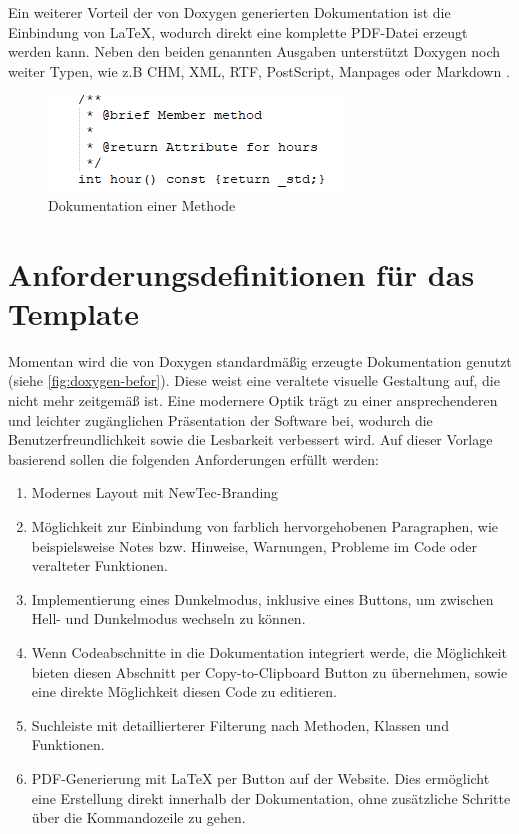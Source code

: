\documentclass[11pt,a4paper]{report}
\begin{document}
\noindent
Ein weiterer Vorteil der von Doxygen generierten Dokumentation ist die Einbindung von LaTeX, wodurch direkt eine komplette PDF-Datei erzeugt werden kann. Neben den beiden genannten Ausgaben unterstützt Doxygen noch weiter Typen, wie z.B  CHM, XML,  RTF,  PostScript,  Manpages oder Markdown \cite{doxygen}.
 \begin{figure}[H]
    \centering
    \includegraphics{images/Doxygen_Example.png}
    \caption{Dokumentation einer Methode}
    \label{fig:doxygen-example}
\end{figure}



\section{Anforderungsdefinitionen für das Template} \label{sec:Requirments}

Momentan wird die von Doxygen standardmäßig erzeugte Dokumentation genutzt (siehe \ref{fig:doxygen-befor}). Diese weist eine veraltete visuelle Gestaltung auf, die nicht mehr zeitgemäß ist. Eine modernere Optik trägt zu einer ansprechenderen und leichter zugänglichen Präsentation der Software bei, wodurch die Benutzerfreundlichkeit sowie die Lesbarkeit verbessert wird. Auf dieser Vorlage basierend sollen die folgenden Anforderungen erfüllt werden:
\begin{enumerate}[label=\textbf{A.\arabic*}]
    \item \label{req:Layout} Modernes Layout mit NewTec-Branding
    \item \label{req:Notes} Möglichkeit zur Einbindung von farblich hervorgehobenen Paragraphen, wie beispielsweise Notes bzw. Hinweise, Warnungen, Probleme im Code oder veralteter Funktionen.
    \item \label{req:Darkmode} Implementierung eines Dunkelmodus, inklusive eines Buttons, um zwischen Hell- und Dunkelmodus wechseln zu können.
    \item \label{req:Copy} Wenn Codeabschnitte in die Dokumentation integriert werde, die Möglichkeit bieten diesen Abschnitt per Copy-to-Clipboard Button zu übernehmen, sowie eine direkte Möglichkeit diesen Code zu editieren.
    \item \label{req:Search} Suchleiste mit detaillierterer Filterung nach Methoden, Klassen und Funktionen.
    \item \label{req:PDF} PDF-Generierung mit LaTeX per Button auf der Website. Dies ermöglicht eine Erstellung direkt innerhalb der Dokumentation, ohne zusätzliche Schritte über die Kommandozeile zu gehen.
\end{enumerate}
\end{document}
